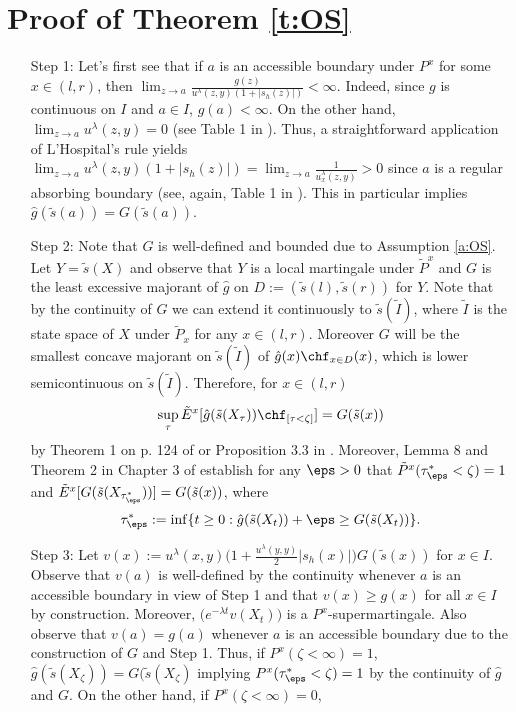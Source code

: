 \documentclass[11pt,reqno]{amsart}
\numberwithin{equation}{section}
\def\rar{\rightarrow}
\begin{document}
	\section{Proof of Theorem \ref{t:OS}}
	\begin{itemize}
		\item[Step 1:] Let's first see that if $a$ is an accessible boundary under $P^x$ for some $x \in (l,r)$, then $\lim_{z \rar a} \frac{g(z)}{u^{\lambda}(z,y)(1+|s_h(z)|)}<\infty$. Indeed, since $g$ is continuous on $I$ and $a\in I$, $g(a)<\infty$. On the other hand, $\lim_{z\rar a}u^{\lambda}(z,y)=0$ (see Table 1 in \cite{MKpar}). Thus, a straightforward application of L'Hospital's rule yields $\lim_{z\rar a}u^{\lambda}(z,y)(1+|s_h(z)|)=\lim_{z\rar a}\frac{1}{u^{\lambda}_x(z,y)}>0$ since $a$ is a regular absorbing boundary (see, again, Table 1 in \cite{MKpar}). This in particular implies $\hat{g}(\tilde{s}(a))=G(\tilde{s}(a))$.
		\item[Step 2:] Note that $G$ is well-defined and bounded due to Assumption \ref{a:OS}. Let $Y=\tilde{s}(X)$ and observe that $Y$ is a local martingale under $\tilde{P}^x$ and $G$ is the least excessive majorant of $\hat{g}$ on $D:=(\tilde{s}(l),\tilde{s}(r))$ for $Y$. Note that by the continuity of $G$ we can extend it continuously to $\tilde{s}(\tilde{I})$, where $\tilde{I}$ is the state space of $X$ under $\tilde{P}_x$ for any $x \in (l,r)$. Moreover $G$ will be the smallest concave majorant  on $\tilde{s}(\tilde{I})$  of $\hat{g}(x)\chf_{x\in D}(x)$, which is lower semicontinuous on $\tilde{s}(\tilde{I})$.  Therefore, for $x \in (l,r)$
		\[
		\sup_{\tau}\tilde{E}^x[\hat{g}(\tilde{s}(X_{\tau}))\chf_{[\tau<\zeta]}]=G(\tilde{s}(x))
		\]
		by Theorem 1 on p. 124 of \cite{Shiryaev} or Proposition 3.3 in \cite{DK}. Moreover, Lemma 8 and Theorem 2 in Chapter 3 of \cite{Shiryaev} establish for any $\eps >0$ that  $\tilde{P}^x(\tau_{\eps}^*<\zeta)=1$ and $\tilde{E}^x[G(\tilde{s}(X_{\tau_{\eps}^*}))]=G(\tilde{s}(x))$, where 
		\[
		\tau_{\eps}^*:=\inf\{t\geq 0: \hat{g}(\tilde{s}(X_t))+\eps \geq G(\tilde{s}(X_t)) \}.
		\]
		\item[Step 3:] Let $v(x):=u^{\lambda}(x,y)\Big(1+\frac{u^{\lambda}(y,y)}{2}|s_h(x)|\Big)G(\tilde{s}(x))$ for $x \in I$. Observe that $v(a)$ is well-defined by the continuity whenever $a$ is an accessible boundary in view of Step 1 and that $v(x)\geq g(x)$ for all $x \in I$ by construction. Moreover, $
		\big(e^{-\lambda t}v(X_t)\big)$ is a $P^x$-supermartingale.  Also observe that $v(a)=g(a)$ whenever $a$ is an accessible boundary due to the construction of $G$ and Step 1. Thus, if $P^x(\zeta<\infty)=1$,  $\hat{g}(\tilde{s}(X_{\zeta}))=G(\tilde{s}(X_{\zeta})$ implying  $P^x(\tau_{\eps}^*<\zeta)=1$ by the continuity of $\hat{g}$ and $G$. On the other hand,  if $P^x(\zeta<\infty)=0$,

\end{itemize}
\end{document}
